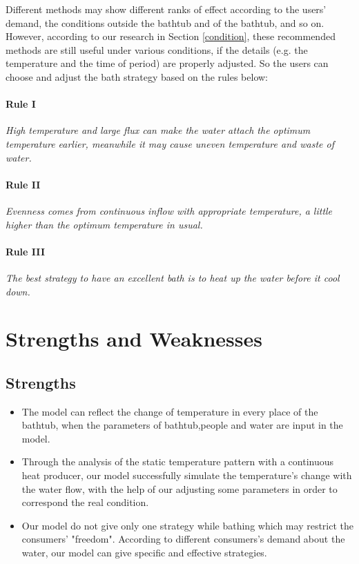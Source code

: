 \documentclass[12pt]{article}
\begin{document}
Different methods may show different ranks of effect according to the users' demand, the conditions
outside the bathtub and of the bathtub, and so on. However, according to our research in Section
\ref{condition}, these recommended methods are still useful under various conditions, if the details
(e.g. the temperature and the time of period) are properly adjusted. So the users can choose and
adjust the bath strategy based on the rules below:

\paragraph{Rule I}
\emph{High temperature and large flux can make the water attach the optimum temperature earlier,
meanwhile it may cause uneven temperature and waste of water.}
\paragraph{Rule II}
\emph{Evenness comes from continuous inflow with appropriate temperature, a little higher than the
optimum temperature in usual.}
\paragraph{Rule III}
\emph{The best strategy to have an excellent bath is to heat up the water before it cool down.}

\section{Strengths and Weaknesses}
\subsection{Strengths}
\begin{itemize}
    \item The model can reflect the change of temperature in every place of the bathtub, when the
    parameters of bathtub,people and water are input in the model.
    \item Through the analysis of the static temperature pattern with a continuous heat producer,
    our model successfully simulate the temperature's change with the water flow, with the help of
    our adjusting some parameters in order to correspond the real condition.
    \item Our model do not give only one strategy while bathing which may restrict the consumers'
    "freedom". According to different consumers's demand about the water, our model can give
    specific and effective strategies.
\end{itemize}
\end{document}
